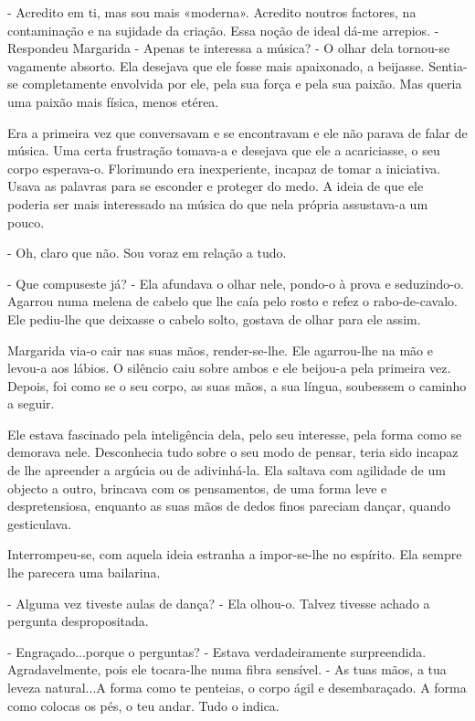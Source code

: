 - Acredito em ti, mas sou mais «moderna». Acredito noutros factores, na
contaminação e na sujidade da criação. Essa noção de ideal dá-me
arrepios. - Respondeu Margarida - Apenas te interessa a música? - O
olhar dela tornou-se vagamente absorto. Ela desejava que ele fosse mais
apaixonado, a beijasse. Sentia-se completamente envolvida por ele, pela
sua força e pela sua paixão. Mas queria uma paixão mais física, menos
etérea.

Era a primeira vez que conversavam e se encontravam e ele não parava de
falar de música. Uma certa frustração tomava-a e desejava que ele a
acariciasse, o seu corpo esperava-o. Florimundo era inexperiente,
incapaz de tomar a iniciativa. Usava as palavras para se esconder e
proteger do medo. A ideia de que ele poderia ser mais interessado na
música do que nela própria assustava-a um pouco.

- Oh, claro que não. Sou voraz em relação a tudo.

- Que compuseste já? - Ela afundava o olhar nele, pondo-o à prova e
seduzindo-o. Agarrou numa melena de cabelo que lhe caía pelo rosto e
refez o rabo-de-cavalo. Ele pediu-lhe que deixasse o cabelo solto,
gostava de olhar para ele assim.

Margarida via-o cair nas suas mãos, render-se-lhe. Ele agarrou-lhe na
mão e levou-a aos lábios. O silêncio caiu sobre ambos e ele beijou-a
pela primeira vez. Depois, foi como se o seu corpo, as suas mãos, a sua
língua, soubessem o caminho a seguir.

Ele estava fascinado pela inteligência dela, pelo seu interesse, pela
forma como se demorava nele. Desconhecia tudo sobre o seu modo de
pensar, teria sido incapaz de lhe apreender a argúcia ou de adivinhá-la.
Ela saltava com agilidade de um objecto a outro, brincava com os
pensamentos, de uma forma leve e despretensiosa, enquanto as suas mãos
de dedos finos pareciam dançar, quando gesticulava.

Interrompeu-se, com aquela ideia estranha a impor-se-lhe no espírito.
Ela sempre lhe parecera uma bailarina.

- Alguma vez tiveste aulas de dança? - Ela olhou-o. Talvez tivesse
achado a pergunta despropositada.

- Engraçado...porque o perguntas? - Estava verdadeiramente surpreendida.
Agradavelmente, pois ele tocara-lhe numa fibra sensível. - As tuas mãos,
a tua leveza natural...A forma como te penteias, o corpo ágil e
desembaraçado. A forma como colocas os pés, o teu andar. Tudo o indica.

